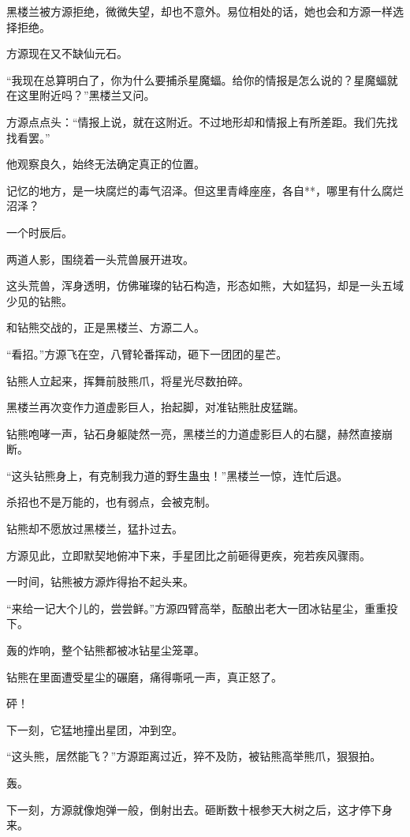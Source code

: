 \begin{this_body}
黑楼兰被方源拒绝，微微失望，却也不意外。易位相处的话，她也会和方源一样选择拒绝。

方源现在又不缺仙元石。

“我现在总算明白了，你为什么要捕杀星魔蝠。给你的情报是怎么说的？星魔蝠就在这里附近吗？”黑楼兰又问。

方源点点头：“情报上说，就在这附近。不过地形却和情报上有所差距。我们先找找看罢。”

他观察良久，始终无法确定真正的位置。

记忆的地方，是一块腐烂的毒气沼泽。但这里青峰座座，各自**，哪里有什么腐烂沼泽？

一个时辰后。

两道人影，围绕着一头荒兽展开进攻。

这头荒兽，浑身透明，仿佛璀璨的钻石构造，形态如熊，大如猛犸，却是一头五域少见的钻熊。

和钻熊交战的，正是黑楼兰、方源二人。

“看招。”方源飞在空，八臂轮番挥动，砸下一团团的星芒。

钻熊人立起来，挥舞前肢熊爪，将星光尽数拍碎。

黑楼兰再次变作力道虚影巨人，抬起脚，对准钻熊肚皮猛踹。

钻熊咆哮一声，钻石身躯陡然一亮，黑楼兰的力道虚影巨人的右腿，赫然直接崩断。

“这头钻熊身上，有克制我力道的野生蛊虫！”黑楼兰一惊，连忙后退。

杀招也不是万能的，也有弱点，会被克制。

钻熊却不愿放过黑楼兰，猛扑过去。

方源见此，立即默契地俯冲下来，手星团比之前砸得更疾，宛若疾风骤雨。

一时间，钻熊被方源炸得抬不起头来。

“来给一记大个儿的，尝尝鲜。”方源四臂高举，酝酿出老大一团冰钻星尘，重重投下。

轰的炸响，整个钻熊都被冰钻星尘笼罩。

钻熊在里面遭受星尘的碾磨，痛得嘶吼一声，真正怒了。

砰！

下一刻，它猛地撞出星团，冲到空。

“这头熊，居然能飞？”方源距离过近，猝不及防，被钻熊高举熊爪，狠狠拍。

轰。

下一刻，方源就像炮弹一般，倒射出去。砸断数十根参天大树之后，这才停下身来。


\end{this_body}
